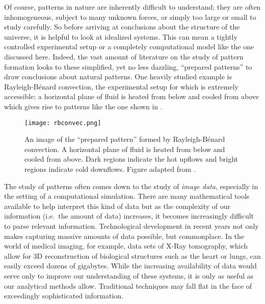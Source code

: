 	Of course, patterns in nature are inherently difficult to understand; they are often inhomogeneous, subject to many unknown forces, or simply too large or small to study carefully. So before arriving at conclusions about the structure of the universe, it is helpful to look at idealized systems. This can mean a tightly controlled experimental setup or a completely computational model like the one discussed here. Indeed, the vast amount of literature on the study of pattern formation looks to these simplified, yet no less dazzling, ``prepared patterns'' to draw conclusions about natural patterns. One heavily studied example is Rayleigh-B\'{e}nard convection, the experimental setup for which is extremely accessible; a horizontal plane of fluid is heated from below and cooled from above which gives rise to patterns like the one shown in .
%
\begin{figure}[h]
	\centering
	\texttt{[image: rbconvec.png]}
	\caption{An image of the ``prepared pattern'' formed by Rayleigh-B\'{e}nard convection. A horizontal plane of fluid is heated from below and cooled from above. Dark regions indicate the hot upflows and bright regions indicate cold downflows. Figure adapted from \protect{}.}
	\label{fig:rbconvec}
\end{figure}
%

	The study of patterns often comes down to the study of \textit{image data}, especially in the setting of a computational simulation. There are many mathematical tools available to help interpret this kind of data but as the complexity of our information (i.e.\ the amount of data) increases, it becomes increasingly difficult to parse relevant information.  Technological development in recent years not only makes capturing massive amounts of data possible, but commonplace. In the world of medical imaging, for example, data sets of X-Ray tomography, which allow for 3D reconstruction of biological structures such as the heart or lungs, can easily exceed dozens of gigabytes. While the increasing availability of data would serve only to improve our understanding of these systems, it is only as useful as our analytical methods allow. Traditional techniques may fall flat in the face of exceedingly sophisticated information.
	
